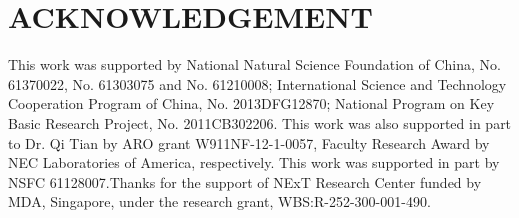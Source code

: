 \vspace{-0.3cm}\section{ACKNOWLEDGEMENT}
This work was supported by National Natural Science Foundation of China, No. 61370022, No.
61303075 and No. 61210008; International Science and Technology Cooperation Program of China,
No. 2013DFG12870; National Program on Key Basic Research Project, No. 2011CB302206.
 This work was also supported in part to Dr. Qi Tian by ARO grant W911NF-12-1-0057, Faculty Research Award by NEC Laboratories of America, respectively. This work was supported in part by NSFC 61128007.Thanks for the support of NExT Research Center funded by MDA, Singapore, under the research
grant, WBS:R-252-300-001-490.

